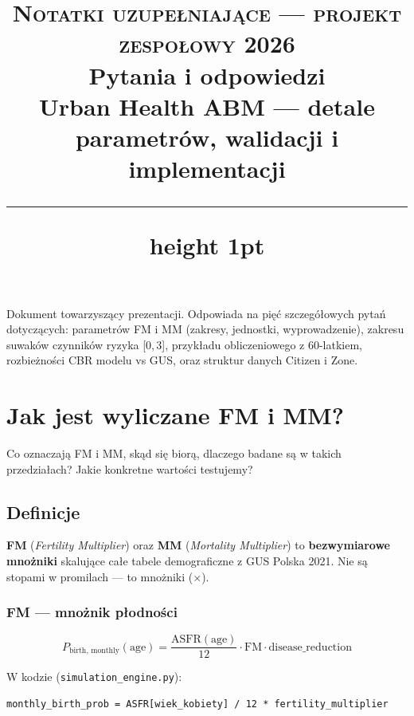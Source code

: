 \documentclass[11pt,a4paper]{article}
\title{
  \vspace{-1.5cm}
  {\small\color{gold}\textsc{Notatki uzupełniające --- projekt zespołowy 2026}}\\[10pt]
  {\Huge\bfseries\color{ink} Pytania i odpowiedzi}\\[6pt]
  {\large\color{ink!70} Urban Health ABM --- detale parametrów, walidacji i implementacji}\\[20pt]
  {\color{rule}\hrule height 1pt}
}
\author{}
\date{}
\begin{document}
\maketitle
\thispagestyle{empty}
\vspace{1cm}

\noindent\textcolor{muted}{\small Dokument towarzyszący prezentacji. Odpowiada na pięć szczegółowych pytań dotyczących:
parametrów FM i MM (zakresy, jednostki, wyprowadzenie),
zakresu suwaków czynników ryzyka [0,\,3],
przykładu obliczeniowego z 60-latkiem,
rozbieżności CBR modelu vs GUS,
oraz struktur danych Citizen i Zone.}

\newpage
\tableofcontents
\newpage

\section{Jak jest wyliczane FM i MM?}

\begin{qbox}
Co oznaczają FM i MM, skąd się biorą, dlaczego badane są w takich przedziałach? Jakie konkretne wartości testujemy?
\end{qbox}

\subsection{Definicje}

\textbf{FM} (\emph{Fertility Multiplier}) oraz \textbf{MM} (\emph{Mortality Multiplier}) to \textbf{bezwymiarowe mnożniki} skalujące całe tabele demograficzne z GUS Polska 2021. Nie są stopami w promilach --- to mnożniki ($\times$).

\subsubsection{FM --- mnożnik płodności}

\begin{formulabox}
\[
P_{\text{birth, monthly}}(\text{age}) = \frac{\text{ASFR}(\text{age})}{12} \cdot \text{FM} \cdot \text{disease\_reduction}
\]
\end{formulabox}

W kodzie (\texttt{simulation\_engine.py}):
\begin{lstlisting}
monthly_birth_prob = ASFR[wiek_kobiety] / 12 * fertility_multiplier
\end{lstlisting}
\end{document}
